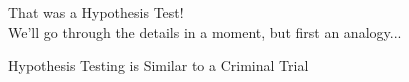 
\begin{frame}
	\begin{center}
	\huge That was a Hypothesis Test!\\
	\normalsize We'll go through the details in a moment, but first an analogy...
	\end{center}
\end{frame}




\begin{frame}
	\begin{center}
	\huge Hypothesis Testing is Similar to a Criminal Trial
	\end{center}
\end{frame}


